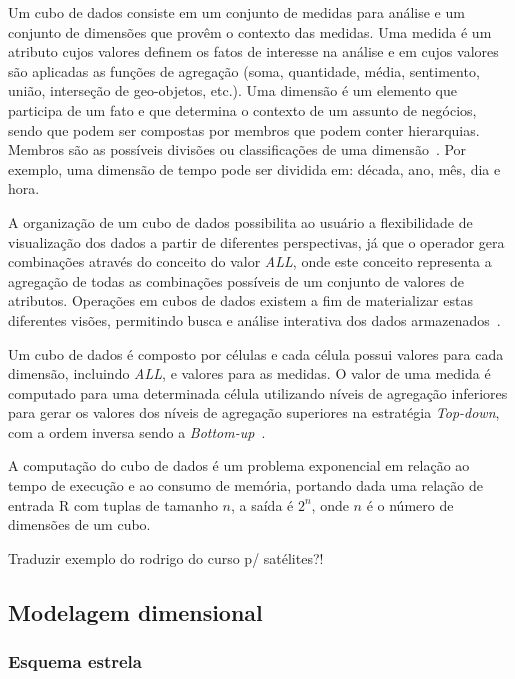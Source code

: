 Um cubo de dados consiste em um conjunto de medidas para análise e um conjunto de dimensões que provêm o contexto das medidas.
Uma medida é um atributo cujos valores definem os fatos de interesse na análise e em cujos valores são aplicadas as funções de agregação (soma, quantidade, média, sentimento, união, interseção de geo-objetos, etc.).
Uma dimensão é um elemento que participa de um fato e que determina o contexto de um assunto de negócios, sendo que podem ser compostas por membros que podem conter hierarquias.
Membros são as possíveis divisões ou classificações de uma dimensão~\cite{silva:2015:abordagensParaCubo}.
Por exemplo, uma dimensão de tempo pode ser dividida em: década, ano, mês, dia e hora.

A organização de um cubo de dados possibilita ao usuário a flexibilidade de visualização dos dados a partir de diferentes perspectivas, já que o operador gera combinações através do conceito do valor \textit{ALL}, onde este conceito representa a agregação de todas as combinações possíveis de um conjunto de valores de atributos.
Operações em cubos de dados existem a fim de materializar estas diferentes visões, permitindo busca e análise interativa dos dados armazenados~\cite{silva:2015:abordagensParaCubo}.

Um cubo de dados é composto por células e cada célula possui valores para cada dimensão, incluindo \textit{ALL}, e valores para as medidas.
O valor de uma medida é computado para uma determinada célula utilizando níveis de agregação inferiores para gerar os valores dos níveis de agregação superiores na estratégia \textit{Top-down}, com a ordem inversa sendo a \textit{Bottom-up}~\cite{silva:2015:abordagensParaCubo}.

A computação do cubo de dados é um problema exponencial em relação ao tempo de execução e ao consumo de memória, portando dada uma relação de entrada R com tuplas de tamanho $n$, a saída é $2^n$, onde $n$ é o número de dimensões de um cubo.

{\color{red} Traduzir exemplo do rodrigo do curso p/ satélites?!}

\subsection{Modelagem dimensional}
\label{ch:fun:cube:dimm}

\subsubsection{Esquema estrela}
\label{ch:fun:cube:dimm:star}

